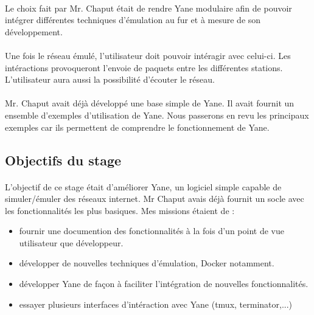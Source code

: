 \documentclass{article}
\begin{document}
	\paragraph{}
	Le choix fait par Mr. Chaput était de rendre Yane modulaire afin de pouvoir intégrer différentes techniques d'émulation au fur et à mesure de son développement.

	\paragraph{}
	Une fois le réseau émulé, l'utilisateur doit pouvoir intéragir avec celui-ci. Les intéractions provoqueront l'envoie de paquets entre les différentes stations. L'utilisateur aura aussi la possibilité d'écouter le réseau.
	
	\paragraph{}
	Mr. Chaput avait déjà développé une base simple de Yane. Il avait fournit un ensemble d'exemples d'utilisation de Yane. Nous passerons en revu les principaux exemples car ils permettent de comprendre le fonctionnement de Yane.
	
	
	\subsection{Objectifs du stage}

	\paragraph{}
	L'objectif de ce stage était d'améliorer Yane, un logiciel simple capable de simuler/émuler des réseaux internet. Mr Chaput avais déjà fournit un socle avec les fonctionnalités les plus basiques. Mes missions étaient de :
			
			\begin{itemize}
				\item fournir une documention des fonctionnalités à la fois d'un point de vue utilisateur que développeur.
				\item développer de nouvelles techniques d'émulation, Docker notamment.
				\item développer Yane de façon à faciliter l'intégration de nouvelles fonctionnalités.
				\item essayer plusieurs interfaces d'intéraction avec Yane (tmux, terminator,...)
			\end{itemize}
	
\end{document}
